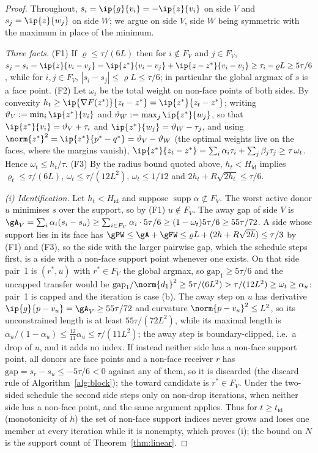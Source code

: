 \begin{proof}
Throughout, $s_i=\ip{g}{v_i}=-\ip{z}{v_i}$ on side $V$ and
$s_j=\ip{z}{w_j}$ on side $W$; we argue on side $V$, side $W$ being
symmetric with the maximum in place of the minimum.

\emph{Three facts.} (F1) If $\varrho\le\tau/(6L)$ then for $i\notin F_V$ and
$j\in F_V$,
$s_j-s_i=\ip{z}{v_i-v_j}=\ip{z^*}{v_i-v_j}+\ip{z-z^*}{v_i-v_j}\ge\tau_i-\varrho L\ge5\tau/6$,
while for $i,j\in F_V$, $|s_i-s_j|\le\varrho L\le\tau/6$; in particular the
global argmax of $s$ is a face point. (F2) Let $\omega_t$ be the total
weight on non-face points of both sides. By convexity
$h_t\ge\ip{\nabla F(z^*)}{z_t-z^*}=\ip{z^*}{z_t-z^*}$; writing
$\vartheta_V:=\min_i\ip{z^*}{v_i}$ and $\vartheta_W:=\max_j\ip{z^*}{w_j}$, so that
$\ip{z^*}{v_i}=\vartheta_V+\tau_i$ and $\ip{z^*}{w_j}=\vartheta_W-\tau_j$, and using
$\norm{z^*}^2=\ip{z^*}{p^*-q^*}=\vartheta_V-\vartheta_W$ (the optimal weights live on the
faces, where the margins vanish),
$\ip{z^*}{z_t-z^*}=\sum_i\alpha_i\tau_i+\sum_j\beta_j\tau_j\ge\tau\,\omega_t$.
Hence $\omega_t\le h_t/\tau$. (F3) By the radius bound quoted above,
$h_t<H_{\mathrm{id}}$ implies $\varrho_t\le\tau/(6L)$, $\omega_t\le\tau/(12L^2)$,
$\omega_t\le1/12$ and $2h_t+R\sqrt{2h_t}\le\tau/6$.

\emph{(i) Identification.} Let $h_t<H_{\mathrm{id}}$ and suppose
$\operatorname{supp}\alpha\not\subset F_V$. The worst active donor $u$
minimises $s$ over the support, so by (F1) $u\notin F_V$. The away gap of
side $V$ is $\gA_V=\sum_i\alpha_i(s_i-s_u)\ge\sum_{i\in F_V}\alpha_i\cdot5\tau/6\ge(1-\omega_t)5\tau/6\ge55\tau/72$.
A side whose support lies in its face has
$\gPW\le\gA+\gFW\le\varrho L+(2h+R\sqrt{2h})\le\tau/3$ by (F1) and (F3), so the
side with the larger pairwise gap, which the schedule steps first, is a
side with a non-face support point whenever one exists. On that side
pair~1 is $(r^*,u)$ with $r^*\in F_V$ the global argmax, so
$\mathrm{gap}_1\ge5\tau/6$ and the uncapped transfer would be
$\mathrm{gap}_1/\norm{d_1}^2\ge5\tau/(6L^2)>\tau/(12L^2)\ge\omega_t\ge\alpha_u$:
pair~1 is capped and the iteration is case (b). The away step on $u$ has
derivative $\ip{g}{p-v_u}=\gA_V\ge55\tau/72$ and curvature
$\norm{p-v_u}^2\le L^2$, so its unconstrained length is at least
$55\tau/(72L^2)$, while its maximal length is
$\alpha_u/(1-\alpha_u)\le\tfrac{12}{11}\alpha_u\le\tau/(11L^2)$; the
away step is boundary-clipped, i.e.\ a drop of $u$, and it adds no index.
If instead neither side has a non-face support point, all donors are
face points and a non-face receiver $r$ has
$\mathrm{gap}=s_r-s_u\le-5\tau/6<0$ against any of them, so it is
discarded (the discard rule of Algorithm~\ref{alg:block}); the toward candidate is
$r^*\in F_V$. Under the two-sided schedule the second side steps only on
non-drop iterations, when neither side has a non-face point, and the same
argument applies. Thus for $t\ge t_{\mathrm{id}}$ (monotonicity of $h$)
the set of non-face support indices never grows and loses one member at
every iteration while it is nonempty, which proves (i); the bound on $N$
is the support count of Theorem~\ref{thm:linear}.


\end{proof}
